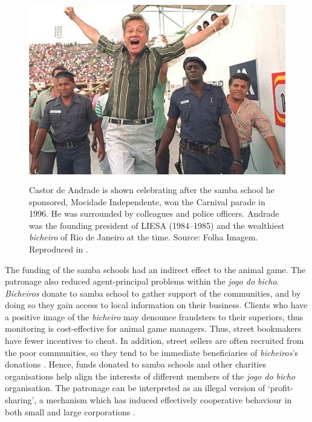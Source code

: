 \begin{figure}[!htbp]
	\centering
	\includegraphics[width=.8\textwidth, height=8cm]{images/bicho07.jpg}
	\caption{Castor de Andrade is shown celebrating after the samba school he sponsored, Mocidade Independente, won the Carnival parade in 1996. He was surrounded by colleagues and police officers. Andrade was the founding president of LIESA (1984--1985) and the wealthiest \emph{bicheiro} of Rio de Janeiro at the time. Source: Folha Imagem. Reproduced in \citet[139]{misse2007illegal}.}
	\label{fig:castor}
\end{figure}

The funding of the samba schools had an indirect effect to the animal game. The patronage also reduced agent-principal problems within the \emph{jogo do bicho}. \emph{Bicheiros} donate to samba school to gather support of the communities, and by doing so they gain access to local information on their business. Clients who have a positive image of the \emph{bicheiro} may denounce fraudsters to their superiors, thus monitoring is cost-effective for animal game managers. Thus, street bookmakers have fewer incentives to cheat. In addition, street sellers are often recruited from the poor communities, so they tend to be immediate beneficiaries of \emph{bicheiros}'s donations \citep{bbc2012aniz}. Hence, funds donated to samba schools and other charities organisations help align the interests of different members of the \emph{jogo do bicho} organisation. The patronage can be interpreted as an illegal version of `profit-sharing', a mechanism which has induced effectively cooperative behaviour in both small and large corporations \citep{cahuc1997profit,fitzroy1987cooperation, kruse1992profit}.

